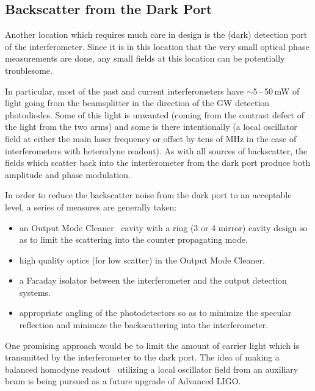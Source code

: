 \subsection{Backscatter from the Dark Port}
Another location which requires much care in design is the (dark)
detection port of the interferometer. Since it is in this location
that the very small optical phase measurements are done, any small
fields at this location can be potentially troublesome.

In particular, most of the past and current interferometers have
$\sim$5\,--\,50\,mW of light going from the beamsplitter in the
direction of the GW detection photodiodes. Some of this light is
unwanted (coming from the contrast defect of the light from the two
arms) and some is there intentionally (a local oscillator field at
either the main laser frequency or offset by tens of MHz in the case
of interferometers with heterodyne readout). As with all sources of
backscatter, the fields which scatter back into the interferometer
from the dark port produce both amplitude and phase modulation.

In order to reduce the backscatter noise from the dark port to an
acceptable level, a series of measures are generally taken:
\begin{itemize}
\item an Output Mode Cleaner~\cite{Rob:2008,Tobin:DC} cavity 
  with a ring (3 or 4 mirror) cavity
  design so as to limit the scattering into the counter propagating mode.
\item high quality optics (for low scatter) in the Output Mode Cleaner.
\item a Faraday isolator between the interferometer and the output
  detection systems.
\item appropriate angling of the photodetectors so as to minimize the
  specular reflection and minimize the backscattering into the interferometer.
\end{itemize}

One promising approach would be to limit the amount of carrier light
which is transmitted by the interferometer to the dark port. The idea
of making a balanced homodyne readout~\cite{fritschel2014balanced}
utilizing a local oscillator field from an auxiliary beam is being
pursued as a future upgrade of Advanced LIGO.


